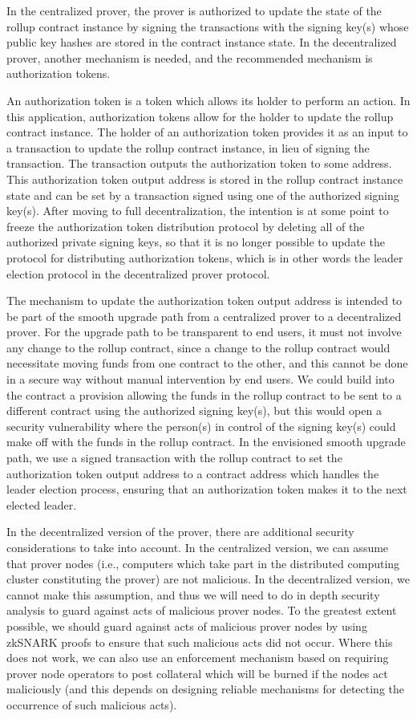 \documentclass[12pt]{article}
\begin{document}
In the centralized prover, the prover is authorized to update the state of the rollup contract instance by signing the transactions with the signing key(s) whose public key hashes are stored in the contract instance state. In the decentralized prover, another mechanism is needed, and the recommended mechanism is authorization tokens.

An authorization token is a token which allows its holder to perform an action. In this application, authorization tokens allow for the holder to update the rollup contract instance. The holder of an authorization token provides it as an input to a transaction to update the rollup contract instance, in lieu of signing the transaction. The transaction outputs the authorization token to some address. This authorization token output address is stored in the rollup contract instance state and can be set by a transaction signed using one of the authorized signing key(s). After moving to full decentralization, the intention is at some point to freeze the authorization token distribution protocol by deleting all of the authorized private signing keys, so that it is no longer possible to update the protocol for distributing authorization tokens, which is in other words the leader election protocol in the decentralized prover protocol.

The mechanism to update the authorization token output address is intended to be part of the smooth upgrade path from a centralized prover to a decentralized prover. For the upgrade path to be transparent to end users, it must not involve any change to the rollup contract, since a change to the rollup contract would necessitate moving funds from one contract to the other, and this cannot be done in a secure way without manual intervention by end users. We could build into the contract a provision allowing the funds in the rollup contract to be sent to a different contract using the authorized signing key(s), but this would open a security vulnerability where the person(s) in control of the signing key(s) could make off with the funds in the rollup contract. In the envisioned smooth upgrade path, we use a signed transaction with the rollup contract to set the authorization token output address to a contract address which handles the leader election process, ensuring that an authorization token makes it to the next elected leader.

In the decentralized version of the prover, there are additional security considerations to take into account. In the centralized version, we can assume that prover nodes (i.e., computers which take part in the distributed computing cluster constituting the prover) are not malicious. In the decentralized version, we cannot make this assumption, and thus we will need to do in depth security analysis to guard against acts of malicious prover nodes. To the greatest extent possible, we should guard against acts of malicious prover nodes by using zkSNARK proofs to ensure that such malicious acts did not occur. Where this does not work, we can also use an enforcement mechanism based on requiring prover node operators to post collateral which will be burned if the nodes act maliciously (and this depends on designing reliable mechanisms for detecting the occurrence of such malicious acts).
\end{document}
